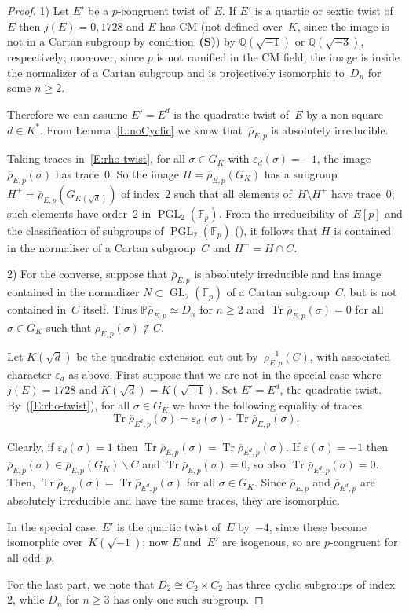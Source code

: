 \documentclass[12pt, reqno]{amsart}
\newcommand{\Fp}{\mathbb{F}_p}
\newcommand{\PP}{\mathbb{P}}
\newcommand{\Q}{\mathbb{Q}}
\newcommand{\rhobar}{{\overline{\rho}}}
\newcommand{\eps}{\varepsilon}
\DeclareMathOperator{\Tr}{Tr}
\newcommand{\GL}{\operatorname{GL}}
\newcommand{\PGL}{\operatorname{PGL}}
\numberwithin{equation}{section}
\theoremstyle{definition}
\theoremstyle{remark}
\begin{document}
\begin{proof} 1) Let $E'$ be a $p$-congruent twist of~$E$. If $E'$ is
  a quartic or sextic twist of~$E$ then $j(E)=0,1728$ and $E$ has CM
  (not defined over~$K$, since the image is not in a Cartan subgroup by condition~{\bf (S)}) by
  $\Q(\sqrt{-1})$ or $\Q(\sqrt{-3})$, respectively; moreover, since $p$ is
  not ramified in the CM field, the image is inside the normalizer of
  a Cartan subgroup and is projectively
   isomorphic to~$D_n$ for some $n \geq 2$.

Therefore we can assume $E' = E^d$ is the quadratic twist of~$E$ by a
non-square $d\in K^*$.  From Lemma~\ref{L:noCyclic} we know
that~$\rhobar_{E,p}$ is absolutely irreducible.

Taking traces in~\eqref{E:rho-twist}, for all $\sigma\in G_K$ with
$\eps_d(\sigma) = -1$, the image~$\rhobar_{E,p}(\sigma)$ has
trace~$0$.  So the image $H=\rhobar_{E,p}(G_K)$ has a
subgroup~$H^+=\rhobar_{E,p}(G_{K(\sqrt{d})})$ of index~$2$ such that
all elements of~$H\setminus H^+$ have trace~$0$; such elements have
order~$2$ in $\PGL_2(\Fp)$. From the irreducibility of~$E[p]$ and the
classification of subgroups of $\PGL_2(\Fp)$ (\cite[Theorem
  XI.2.3]{LangModForms}), it follows that $H$ is contained in the
normaliser of a Cartan subgroup~$C$ and $H^+=H\cap C$.

2) For the converse, suppose that $\rhobar_{E,p}$ is absolutely irreducible and has image contained in
the normalizer $N \subset \GL_2(\Fp)$ of a Cartan subgroup~$C$, but
is not contained in~$C$ itself. Thus $\PP \rhobar_{E,p} \simeq D_n$ for $n \geq 2$ and
$\Tr \rhobar_{E,p}(\sigma) = 0$
for all $\sigma \in G_K$ such that $\rhobar_{E,p}(\sigma) \not\in C$.

Let $K(\sqrt{d})$ be the quadratic extension cut out
by~$\rhobar_{E,p}^{-1}(C)$, with associated character $\eps_d$ as
above.  First suppose that we are not in the special case where
$j(E)=1728$ and $K(\sqrt{d})=K(\sqrt{-1})$.  Set $E'=E^d$, the
quadratic twist.  By~(\ref{E:rho-twist}), for all $\sigma \in G_K$ we
have the following equality of traces
\[\Tr \rhobar_{{E^d},p}(\sigma) = \eps_d(\sigma) \cdot \Tr \rhobar_{E,p}(\sigma).\]

Clearly, if $\eps_d(\sigma)=1$ then $\Tr \rhobar_{E,p}(\sigma) = \Tr \rhobar_{E^d,p}(\sigma)$. 
If $\eps(\sigma) = -1$ then $\rhobar_{E,p}(\sigma) \in \rhobar_{E,p} (G_K) \backslash C$ and $\Tr \rhobar_{E,p}(\sigma) = 0$, so also $\Tr \rhobar_{E^d,p}(\sigma) = 0$.
Then, $\Tr \rhobar_{E,p}(\sigma) = \Tr \rhobar_{E^d,p}(\sigma)$ 
for all $\sigma \in G_K$. 
Since $\rhobar_{E,p}$ and $\rhobar_{E^d,p}$ are absolutely irreducible
and have the same traces, they are isomorphic.

In the special case, $E'$ is the quartic twist of~$E$ by~$-4$, since
these become isomorphic over~$K(\sqrt{-1})$; now $E$ and~$E'$ are
isogenous, so are $p$-congruent for all odd~$p$.

For the last part, we note that $D_2\cong C_2\times C_2$ has three
cyclic subgroups of index~$2$, while $D_n$ for $n\ge3$ has only one
such subgroup.
\end{proof}
\end{document}
